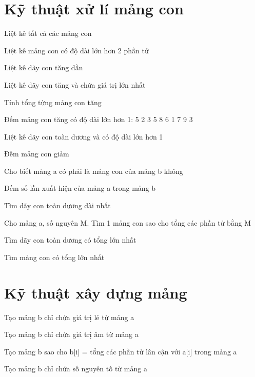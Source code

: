 \section{Kỹ thuật xử lí mảng con}
\begin{problem}
    Liệt kê tất cả các mảng con
\end{problem}
\begin{problem}
    Liệt kê mảng con có độ dài lớn hơn 2 phần tử
\end{problem}
\begin{problem}
    Liệt kê dãy con tăng dần
\end{problem}
\begin{problem}
    Liệt kê dãy con tăng và chứa giá trị lớn nhất
\end{problem}
\begin{problem}
    Tính tổng từng mảng con tăng
\end{problem}
\begin{problem}
    Đếm mảng con tăng có độ dài lớn hơn 1: 5 2 3 5 8 6 1 7 9 3
\end{problem}
\begin{problem}
    Liệt kê dãy con toàn dương và có độ dài lớn hơn 1
\end{problem}
\begin{problem}
    Đếm mảng con giảm
\end{problem}
\begin{problem}
    Cho biết mảng a có phải là mảng con của mảng b không
\end{problem}
\begin{problem}
    Đếm số lần xuất hiện của mảng a trong mảng b
\end{problem}
\begin{problem}
    Tìm dãy con toàn dương dài nhất
\end{problem}
\begin{problem}
    Cho mảng a, số nguyên M. Tìm 1 mảng con sao cho tổng các phần tử bằng M
\end{problem}
\begin{problem}
    Tìm dãy con toàn dương có tổng lớn nhất
\end{problem}
\begin{problem}
    Tìm mảng con có tổng lớn nhất
\end{problem}


\section{Kỹ thuật xây dựng mảng}
\begin{problem}
    Tạo mảng b chỉ chứa giá trị lẻ từ mảng a
\end{problem}
\begin{problem}
    Tạo mảng b chỉ chứa giá trị âm từ mảng a
\end{problem}
\begin{problem}
    Tạo mảng b sao cho b[i] = tổng các phần tử lân cận với a[i] trong mảng a
\end{problem}
\begin{problem}
    Tạo mảng b chỉ chứa số nguyên tố từ mảng a
\end{problem}

